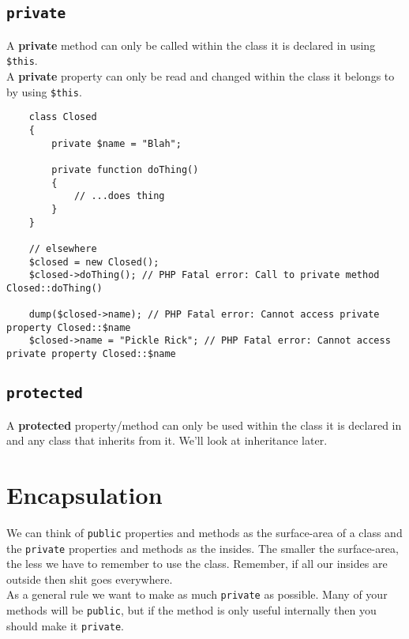 \subsection{\texttt{private}}

A \textbf{private} method can only be called within the class it is declared in using \texttt{\$this}.
\\

A \textbf{private} property can only be read and changed within the class it belongs to by using \texttt{\$this}.

\begin{verbatim}
    class Closed
    {
        private $name = "Blah";

        private function doThing()
        {
            // ...does thing
        }
    }

    // elsewhere
    $closed = new Closed();
    $closed->doThing(); // PHP Fatal error: Call to private method Closed::doThing()

    dump($closed->name); // PHP Fatal error: Cannot access private property Closed::$name
    $closed->name = "Pickle Rick"; // PHP Fatal error: Cannot access private property Closed::$name
\end{verbatim}

\subsection{\texttt{protected}}

A \textbf{protected} property/method can only be used within the class it is declared in and any class that inherits from it. We'll look at inheritance later.


\section{Encapsulation}

We can think of \texttt{public} properties and methods as the surface-area of a class and the \texttt{private} properties and methods as the insides. The smaller the surface-area, the less we have to remember to use the class. Remember, if all our insides are outside then shit goes everywhere.
\\

As a general rule we want to make as much \texttt{private} as possible. Many of your methods will be \texttt{public}, but if the method is only useful internally then you should make it \texttt{private}.
\\

